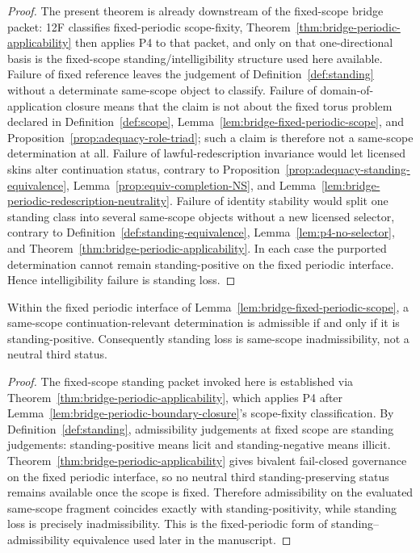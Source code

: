 \begin{proof}
The present theorem is already downstream of the fixed-scope bridge packet: 12F classifies fixed-periodic scope-fixity, Theorem~\ref{thm:bridge-periodic-applicability} then applies P4 to that packet, and only on that one-directional basis is the fixed-scope standing/intelligibility structure used here available. Failure of fixed reference leaves the judgement of Definition~\ref{def:standing} without a determinate same-scope object to classify. Failure of domain-of-application closure means that the claim is not about the fixed torus problem declared in Definition~\ref{def:scope}, Lemma~\ref{lem:bridge-fixed-periodic-scope}, and Proposition~\ref{prop:adequacy-role-triad}; such a claim is therefore not a same-scope determination at all. Failure of lawful-redescription invariance would let licensed skins alter continuation status, contrary to Proposition~\ref{prop:adequacy-standing-equivalence}, Lemma~\ref{prop:equiv-completion-NS}, and Lemma~\ref{lem:bridge-periodic-redescription-neutrality}. Failure of identity stability would split one standing class into several same-scope objects without a new licensed selector, contrary to Definition~\ref{def:standing-equivalence}, Lemma~\ref{lem:p4-no-selector}, and Theorem~\ref{thm:bridge-periodic-applicability}. In each case the purported determination cannot remain standing-positive on the fixed periodic interface. Hence intelligibility failure is standing loss.
\end{proof}

\begin{manualtheorem}
\label{thm:st3-standing-admissibility-equivalence}
Within the fixed periodic interface of Lemma~\ref{lem:bridge-fixed-periodic-scope}, a same-scope continuation-relevant determination is admissible if and only if it is standing-positive. Consequently standing loss is same-scope inadmissibility, not a neutral third status.
\end{manualtheorem}

\begin{proof}
The fixed-scope standing packet invoked here is established via Theorem~\ref{thm:bridge-periodic-applicability}, which applies P4 after Lemma~\ref{lem:bridge-periodic-boundary-closure}'s scope-fixity classification. By Definition~\ref{def:standing}, admissibility judgements at fixed scope are standing judgements: standing-positive means licit and standing-negative means illicit. Theorem~\ref{thm:bridge-periodic-applicability} gives bivalent fail-closed governance on the fixed periodic interface, so no neutral third standing-preserving status remains available once the scope is fixed. Therefore admissibility on the evaluated same-scope fragment coincides exactly with standing-positivity, while standing loss is precisely inadmissibility. This is the fixed-periodic form of standing--admissibility equivalence used later in the manuscript.
\end{proof}

